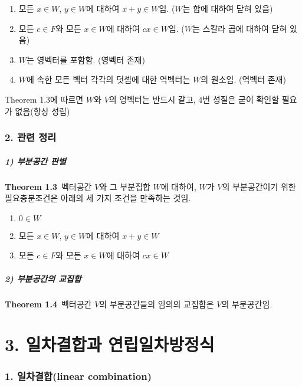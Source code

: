 \begin{enumerate}
    \item 모든 $x \in W$, $y \in W$에 대하여 $x+y \in W$임. ($W$는 합에 대하여 닫혀 있음)
    \item 모든 $c \in F$와 모든 $x \in W$에 대하여 $cx \in W$임. ($W$는 스칼라 곱에 대하여 닫혀 있음)
    \item $W$는 영벡터를 포함함. (영벡터 존재)
    \item $W$에 속한 모든 벡터 각각의 덧셈에 대한 역벡터는 $W$의 원소임. (역벡터 존재)
\end{enumerate}

Theorem 1.3에 따르면 $W$와 $V$의 영벡터는 반드시 같고, 4번 성질은 굳이 확인할 필요가 없음(항상 성립)\\


\section*{2. 관련 정리}
\subsubsection*{1) 부분공간 판별}
\textbf{Theorem 1.3}\, 벡터공간 $V$와 그 부분집합 $W$에 대하여, $W$가 $V$의 부분공간이기 위한 필요충분조건은 아래의 세 가지 조건을 만족하는 것임.

\begin{enumerate}
    \item $0 \in W$
    \item 모든 $x \in W$, $y \in W$에 대하여 $x+y \in W$
    \item 모든 $c \in F$와 모든 $x \in W$에 대하여 $cx \in W$
\end{enumerate}

\subsubsection*{2) 부분공간의 교집합}

\textbf{Theorem 1.4}\, 벡터공간 $V$의 부분공간들의 임의의 교집합은 $V$의 부분공간임.\\


\newpage


\part*{3. 일차결합과 연립일차방정식}

\section*{1. 일차결합(linear combination)}

